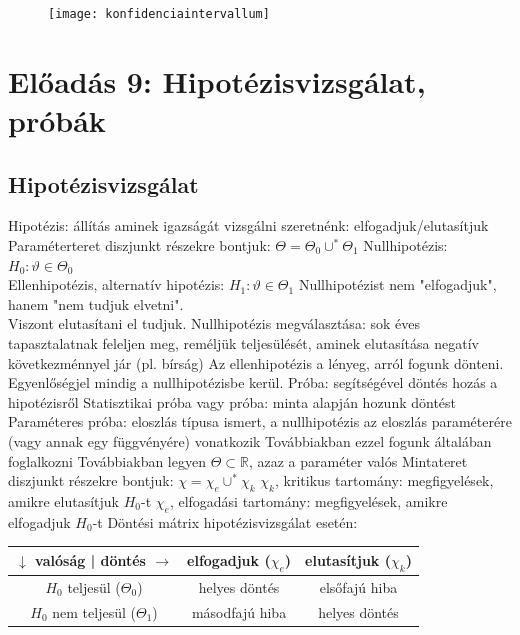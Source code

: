 \documentclass[12pt,a4paper]{article}
\begin{document}
\begin{figure}[h!]
	\centering
	\texttt{[image: konfidenciaintervallum]}
\end{figure}

\pagebreak

\section{Előadás 9: Hipotézisvizsgálat, próbák}

\subsection{Hipotézisvizsgálat}

\begin{outline}
	\1 Hipotézis: állítás aminek igazságát vizsgálni szeretnénk: elfogadjuk/elutasítjuk
	\1 Paraméterteret diszjunkt részekre bontjuk: $\Theta = \Theta_0 \cup^* \Theta_1$
	\1 Nullhipotézis: $H_0 : \vartheta \in \Theta_0$\\
	Ellenhipotézis, alternatív hipotézis: $H_1 : \vartheta \in \Theta_1$
	\1 Nullhipotézist nem "elfogadjuk", hanem "nem tudjuk elvetni".\\
	Viszont elutasítani el tudjuk.
	\1 Nullhipotézis megválasztása: sok éves tapasztalatnak feleljen meg, reméljük teljesülését, aminek elutasítása negatív következménnyel jár (pl. bírság)
		\2 Az ellenhipotézis a lényeg, arról fogunk dönteni.
		\2 Egyenlőségjel mindig a nullhipotézisbe kerül.
	\1 Próba: segítségével döntés hozás a hipotézisről
		\2 Statisztikai próba vagy próba: minta alapján hozunk döntést
		\2 Paraméteres próba: eloszlás típusa ismert, a nullhipotézis az eloszlás paraméterére (vagy annak egy függvényére) vonatkozik
			\3 Továbbiakban ezzel fogunk általában foglalkozni
			\3 Továbbiakban legyen $\Theta \subset \mathbb{R}$, azaz a paraméter valós
	\1 Mintateret diszjunkt részekre bontjuk: $\chi = \chi_e \cup^* \chi_k$
		\2 $\chi_k$, kritikus tartomány: megfigyelések, amikre elutasítjuk $H_0$-t
		\2 $\chi_e$, elfogadási tartomány: megfigyelések, amikre elfogadjuk $H_0$-t
	\1 Döntési mátrix hipotézisvizsgálat esetén:
\end{outline}

\begin{table}[h]
	\centering
	\begin{tabular}{|c|c|c|}
		\hline
		$\downarrow$ valóság | döntés $\to$ & elfogadjuk ($\chi_e$) & elutasítjuk ($\chi_k$) \\
		\hline
		$H_0$ teljesül ($\Theta_0$) & helyes döntés & elsőfajú hiba \\
		\hline
		$H_0$ nem teljesül ($\Theta_1$) & másodfajú hiba & helyes döntés \\
		\hline
	\end{tabular}
\end{table}
\end{document}
